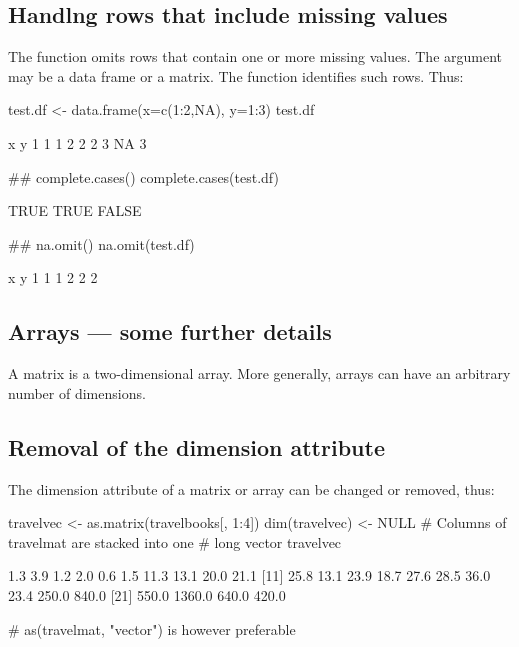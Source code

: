 \subsection{Handlng rows that include missing values}
The function  omits rows that contain one
or more missing values. The argument may be a data frame or a
matrix. The function  identifies
such rows. Thus:
\begin{Schunk}
\begin{Sinput}
test.df <- data.frame(x=c(1:2,NA), y=1:3)
test.df
\end{Sinput}
\begin{Soutput}
   x y
1  1 1
2  2 2
3 NA 3
\end{Soutput}
\begin{Sinput}
## complete.cases()
complete.cases(test.df)
\end{Sinput}
\begin{Soutput}
[1]  TRUE  TRUE FALSE
\end{Soutput}
\begin{Sinput}
## na.omit()
na.omit(test.df)
\end{Sinput}
\begin{Soutput}
  x y
1 1 1
2 2 2
\end{Soutput}
\end{Schunk}

\subsection{Arrays --- some further details}

A matrix is a two-dimensional array.  More generally, arrays can
have an arbitrary number of dimensions.

\subsection*{Removal of the dimension attribute}

The dimension attribute of a matrix or array can be changed or
removed, thus:
\begin{fullwidth}

\begin{Schunk}
\begin{Sinput}
travelvec <-  as.matrix(travelbooks[, 1:4])
dim(travelvec) <- NULL  # Columns of travelmat are stacked into one
                        # long vector
travelvec
\end{Sinput}
\begin{Soutput}
 [1]    1.3    3.9    1.2    2.0    0.6    1.5   11.3   13.1   20.0   21.1
[11]   25.8   13.1   23.9   18.7   27.6   28.5   36.0   23.4  250.0  840.0
[21]  550.0 1360.0  640.0  420.0
\end{Soutput}
\begin{Sinput}
  # as(travelmat, "vector") is however preferable
\end{Sinput}
\end{Schunk}

\end{fullwidth}

